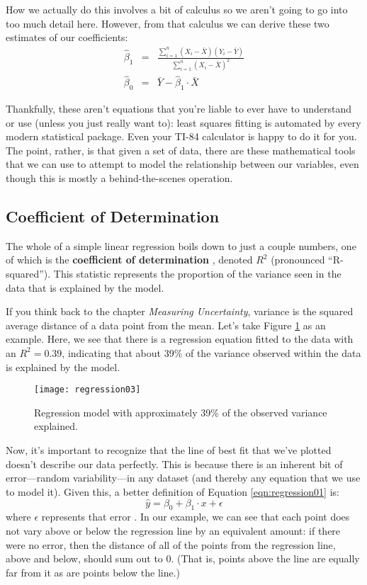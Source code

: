 How we actually do this involves a bit of calculus so we aren't going to go into too much detail here. However, from that calculus we can derive these two estimates of our coefficients:
\begin{eqnarray*}
\hat{\beta}_1 &=& \frac{\sum_{i=1}^n\left(X_i-\bar{X}\right)\left(Y_i-\bar{Y}\right)}{\sum_{i=1}^n\left(X_i-\bar{X}\right)^2}\\
\hat{\beta}_0 &=& \bar{Y}-\hat{\beta}_1\cdot \bar{X}
\end{eqnarray*}

Thankfully, these aren't equations that you're liable to ever have to understand or use (unless you just really want to): least squares fitting is automated by every modern statistical package. Even your TI-84 calculator is happy to do it for you. The point, rather, is that given a set of data, there are these mathematical tools that we can use to attempt to model the relationship between our variables, even though this is mostly a behind-the-scenes operation.

\subsection{Coefficient of Determination}

The whole of a simple linear regression boils down to just a couple numbers, one of which is the \textbf{coefficient of determination} , denoted $R^2$ (pronounced ``R-squared''). This statistic represents the proportion of the variance seen in the data that is explained by the model.

If you think back to the chapter \textit{Measuring Uncertainty}, variance is the squared average distance of a data point from the mean. Let's take Figure \ref{fig:regression03} as an example. Here, we see that there is a regression equation fitted to the data with an $R^2=0.39$, indicating that about 39\% of the variance observed within the data is explained by the model.

\begin{figure}[htp]
\texttt{[image: regression03]}
\caption{Regression model with approximately 39\% of the observed variance explained.}
\label{fig:regression03}
\end{figure}

Now, it's important to recognize that the line of best fit that we've plotted doesn't describe our data perfectly. This is because there is an inherent bit of error---random variability---in any dataset (and thereby any equation that we use to model it). Given this, a better definition of Equation \ref{eqn:regression01} is:
\begin{equation}
\hat{y} = \beta_0 + \beta_1\cdot x+\epsilon
\label{eqn:regression02}
\end{equation}
where $\epsilon$ represents that error . In our example, we can see that each point does not vary above or below the regression line by an equivalent amount: if there were no error, then the distance of all of the points from the regression line, above and below, should sum out to 0. (That is, points above the line are equally far from it as are points below the line.)

